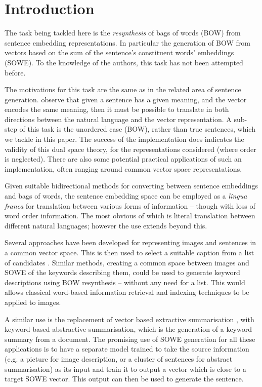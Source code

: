 {\section{Introduction} %

The task being tackled here is the \emph{resynthesis} of bags of words (BOW) from sentence embedding representations. In particular the generation of BOW from vectors based on the sum of the sentence's constituent words' embeddings (SOWE). To the knowledge of the authors, this task has not been attempted before.

The motivations for this task are the same as in the related area of sentence generation. \textcite{Dinu2014CompositionalGeneration} observe that given  a sentence has a given meaning, and the vector encodes the same meaning, then it must be possible to translate in both directions between the natural language and the vector representation. A sub-step of this task is the unordered case (BOW), rather than true sentences, which we tackle in this paper. The success of the implementation does indicates the validity of this dual space theory, for the representations considered (where order is neglected).  There are also some potential practical applications of such an implementation, often ranging around common vector space representations.

Given suitable bidirectional methods for converting between sentence embeddings and bags of words, the sentence embedding space can be employed as a \emph{lingua franca} for translation between various forms of information -- though with loss of word order information. The most obvious of which is literal translation between different natural languages; however the use extends beyond this.

Several approaches have been developed for representing images and sentences in a common vector space. This is then used to select a suitable caption from a list of candidates \parencite{farhadi2010every,socherDTRNN}. Similar methods, creating a common space between images and SOWE of the keywords describing them, could be used to generate keyword descriptions using BOW resynthesis -- without any need for a list. This would allows classical word-based information retrieval and indexing techniques to be applied to images.

A similar use is the replacement of vector based extractive summarisation \parencite{KaagebExtractiveSummaristation,yogatamaextractive}, with keyword based abstractive summarisation, which is the generation of a keyword summary from a document. The promising use of SOWE generation for all these applications is to have a separate model trained to take the source information (e.g. a picture for image description, or a cluster of sentences for abstract summarisation) as its input and train it to output a vector which is close to a target SOWE vector. This output can then be used to generate the sentence.


}
